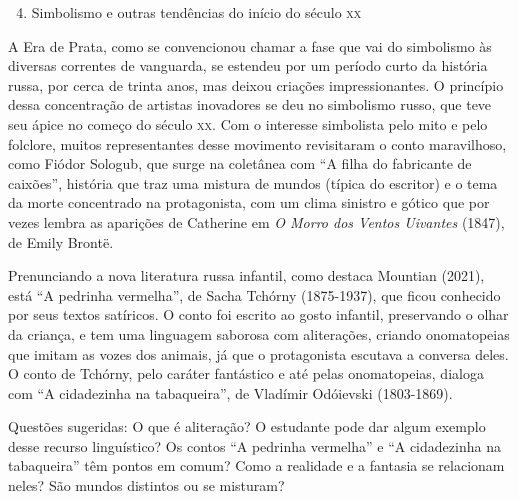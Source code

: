 \documentclass[11pt]{extarticle}
\begin{document}
\begin{enumerate}
\setcounter{enumi}{3}
\item Simbolismo e outras tendências do início do século \textsc{xx}
\end{enumerate}


A Era de Prata, como se convencionou chamar a fase que vai do
simbolismo às diversas correntes de vanguarda, se estendeu por um
período curto da história russa, por cerca de trinta anos, mas deixou
criações impressionantes. O princípio dessa concentração de artistas
inovadores se deu no simbolismo russo, que teve seu ápice no começo do
século \textsc{xx}. Com o interesse simbolista pelo mito e pelo folclore, muitos
representantes desse movimento revisitaram o conto maravilhoso, como
Fiódor Sologub, que surge na coletânea com ``A filha do fabricante de
caixões'', história que traz uma mistura de mundos (típica do
escritor) e o tema da morte concentrado na protagonista, com um clima
sinistro e gótico que por vezes lembra as aparições de Catherine em
\emph{O Morro dos Ventos Uivantes} (1847), de Emily Brontë.

Prenunciando a nova literatura russa infantil, como destaca Mountian
(2021), está ``A pedrinha vermelha'', de Sacha Tchórny (1875-1937), que
ficou conhecido por seus textos satíricos. O conto foi escrito ao gosto
infantil, preservando o olhar da criança, e tem uma linguagem saborosa
com aliterações, criando onomatopeias que imitam as vozes dos animais, já
que o protagonista escutava a conversa deles. O conto de Tchórny, pelo
caráter fantástico e até pelas onomatopeias, dialoga com ``A cidadezinha
na tabaqueira'', de Vladímir Odóievski (1803-1869).


Questões sugeridas: O que é aliteração? O estudante pode dar algum
exemplo desse recurso linguístico? Os contos ``A pedrinha vermelha'' e
``A cidadezinha na tabaqueira'' têm pontos em comum? Como a realidade e
a fantasia se relacionam neles? São mundos distintos ou se misturam?
\end{document}
